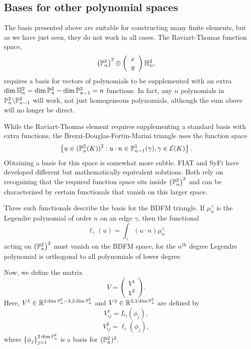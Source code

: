 \subsection{Bases for other polynomial spaces}
The basis presented above are suitable for constructing many finite
elements, but as we have just seen, they do not work in all cases.
The Raviart-Thomas function space,
\[
\left( \P^2_n \right)^2 \oplus 
\left( \begin{array}{c} x \\ y \end{array} \right) \H^2_n,
\]
requires a basis for vectors of polynomials to be supplemented with
an extra \( \dim \H^2_n = \dim \P^2_n - \dim \P^2_{n-1} = n \) functions.  In fact,
any \( n \) polynomials in \( \P^2_n \backslash \P^2_{n-1} \) will
work, not just homogeneous polynomials, although the sum above will no
longer be direct. 

While the Raviart-Thomas element requires supplementing a standard
basis with extra functions, the Brezzi-Douglas-Fortin-Marini triangle
uses the function space 
\[
\left\{
u \in (\P^2_n (K) )^2 : u \cdot n \in \P^1_{n-1}(\gamma), \gamma \in
\mathcal{E}(K) 
\right\}.
\]
Obtaining a basis for this space
is somewhat more subtle.  FIAT and SyFi have developed different
but mathematically equivalent solutions.  Both rely on recognizing that the
required function space sits inside \( \left( \P^2_n \right)^2 \) and can
be characterized by certain functionals that vanish on this larger
space.  

Three such functionals describe the basis for the BDFM triangle.
If \( \mu^\gamma_n \)
is the Legendre polynomial of order \( n \) on an edge \( \gamma \),
then the functional 
\[
\ell_\gamma( u ) = \int_{\gamma} (u \cdot n) \mu_n^\gamma
\]
acting on \( \left( \P^2_n \right)^2 \)
must vanish on the BDFM space, for the \( n^\mathrm{th} \) degree
Legendre polynomial is orthogonal to all polynomials of lower degree.

Now, we define the matrix
\begin{equation}
V = \left( \begin{array}{c} V^1 \\ V^2 \end{array} \right).
\end{equation}
Here, \( V^1 \in \mathbb{R}^{2 \dim \P^2_n - 3, 2\dim \P^2_n} \) and 
\( V^2 \in \mathbb{R}^{3, 2 \dim \P^2_n} \) are defined
by
\[V^1_{ij} = L_i( \phi_j ),
\]
\[
V^2_{ij} = \ell_i( \phi_j ),
\]
where \( \{ \phi_j \}_{j=1}^{2 \dim{\P^2_n}} \) is a basis for \( (\P^2_n)^2
\).

